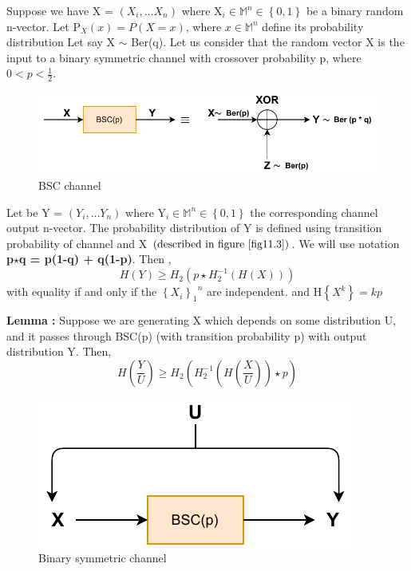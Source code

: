 \documentclass{article}
\begin{document}
Suppose we have X = $\left( X_i, \dots X_n\right)$ where X$_{i} \in \mathbb{M}^{{n}} \in \left \{ 0,1\right \}$
 be a binary random n-vector.
Let P$_{X}(x)= P\left( X = x \right)$, where $x \in \mathbb{M}^{n}$  define its probability distribution Let say X $\sim$ Ber(q). Let us consider that the random vector X is the input to a binary symmetric channel with crossover probability  p, where $0 < p < \frac{1}{2}$.
\begin{figure}[h!]
	\centering
	\includegraphics[height=.12\textheight]{pic8.pdf}
	\caption{BSC channel }
	\label{fig11.3}
\end{figure}
 Let  be  Y = $\left( Y_i, \dots Y_n\right)$ where Y$_{i} \in \mathbb{M}^{{n}} \in \left \{ 0,1\right \}$
the corresponding channel output n-vector. The probability
distribution of Y is defined using transition probability of channel and X $\left( \text{described in figure \ref{fig11.3}} \right)$.
We will use notation \textbf{p$\star$q = p(1-q) + q(1-p)}. Then ,
\begin{equation}
	H(Y) \geq H_{2}\left( p \star H_{2}^{-1} \left( H(X)\right)\right) \label{11.31}	
\end{equation}		
with equality if and only if the ${\left\{X_{i}\right \}_{1}}^{n}$ are independent. and H$\left\{ X^k
\right\} = kp$ 

\textbf{Lemma :} \hspace{1mm} Suppose we are generating X which depends on some distribution U, and it passes through BSC(p) (with transition probability p) with output distribution Y. Then,
\begin{equation}
	H\left(\frac{Y}{U}\right) \geq H_2\left( H_{2}^{-1}\left( H\left( \frac{X}{U}\right)\right) \star p\right)
\end{equation}
\begin{figure}[h!]
	\centering
	\includegraphics[height=.12\textheight]{pic9.pdf}
	\caption{Binary symmetric channel }
	\label{fig11.4}
\end{figure}
\end{document}

